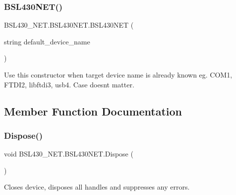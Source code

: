 \subsubsection{\texorpdfstring{BSL430NET()}{BSL430NET()}\hspace{0.1cm}{\footnotesize\ttfamily [4/4]}}
{\footnotesize\ttfamily B\+S\+L430\+\_\+\+N\+E\+T.\+B\+S\+L430\+N\+E\+T.\+B\+S\+L430\+N\+ET (\begin{DoxyParamCaption}\item[{string}]{default\+\_\+device\+\_\+name }\end{DoxyParamCaption})}



Use this constructor when target device name is already known eg. C\+O\+M1, F\+T\+D\+I2, libftdi3, usb4. Case doesnt matter. 



\subsection{Member Function Documentation}
\mbox{\label{class_b_s_l430___n_e_t_1_1_b_s_l430_n_e_t_a3e21b80cdbe759cbc45ffa7bd6d7406e}} 
\subsubsection{\texorpdfstring{Dispose()}{Dispose()}}
{\footnotesize\ttfamily void B\+S\+L430\+\_\+\+N\+E\+T.\+B\+S\+L430\+N\+E\+T.\+Dispose (\begin{DoxyParamCaption}{ }\end{DoxyParamCaption})}



Closes device, disposes all handles and suppresses any errors. 

\mbox{\label{class_b_s_l430___n_e_t_1_1_b_s_l430_n_e_t_a76453c32bcc4006f08720bbede236583}} 
